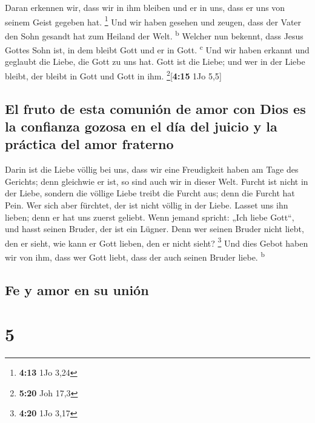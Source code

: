  Daran erkennen wir, dass wir in ihm bleiben und er in
uns, dass er uns von seinem Geist gegeben hat. \footnote{\textbf{4:13}
  1Jo 3,24}  Und wir haben gesehen und zeugen, dass der
Vater den Sohn gesandt hat zum Heiland der Welt. \textsuperscript{b}
 Welcher nun bekennt, dass Jesus Gottes Sohn ist, in dem
bleibt Gott und er in Gott. \textsuperscript{c}  Und wir
haben erkannt und geglaubt die Liebe, die Gott zu uns hat. Gott ist die
Liebe; und wer in der Liebe bleibt, der bleibt in Gott und Gott in ihm.
\footnote{\textbf{5:20} Joh 17,3}{[}\textbf{4:15} 1Jo 5,5{]}

\hypertarget{el-fruto-de-esta-comuniuxf3n-de-amor-con-dios-es-la-confianza-gozosa-en-el-duxeda-del-juicio-y-la-pruxe1ctica-del-amor-fraterno}{%
\subsection{El fruto de esta comunión de amor con Dios es la confianza
gozosa en el día del juicio y la práctica del amor
fraterno}\label{el-fruto-de-esta-comuniuxf3n-de-amor-con-dios-es-la-confianza-gozosa-en-el-duxeda-del-juicio-y-la-pruxe1ctica-del-amor-fraterno}}

 Darin ist die Liebe völlig bei uns, dass wir eine
Freudigkeit haben am Tage des Gerichts; denn gleichwie er ist, so sind
auch wir in dieser Welt.  Furcht ist nicht in der Liebe,
sondern die völlige Liebe treibt die Furcht aus; denn die Furcht hat
Pein. Wer sich aber fürchtet, der ist nicht völlig in der Liebe.
 Lasset uns ihn lieben; denn er hat uns zuerst geliebt.
 Wenn jemand spricht: „Ich liebe Gott``, und hasst seinen
Bruder, der ist ein Lügner. Denn wer seinen Bruder nicht liebt, den er
sieht, wie kann er Gott lieben, den er nicht sieht? \footnote{\textbf{4:20}
  1Jo 3,17}  Und dies Gebot haben wir von ihm, dass wer
Gott liebt, dass der auch seinen Bruder liebe. \textsuperscript{b}

\hypertarget{fe-y-amor-en-su-uniuxf3n}{%
\subsection{Fe y amor en su unión}\label{fe-y-amor-en-su-uniuxf3n}}

\hypertarget{section-4}{%
\section{5}\label{section-4}}

